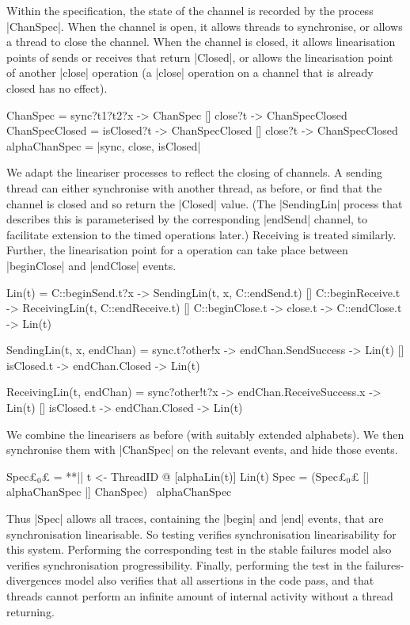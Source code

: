 Within the specification, the state of the channel is recorded by the process
|ChanSpec|.  When the channel is open, it allows threads to synchronise, or
allows a thread to close the channel.  When the channel is closed, it allows
linearisation points of sends or receives that return |Closed|, or allows the
linearisation point of another |close| operation (a |close| operation on a
channel that is already closed has no effect).
%
\begin{cspm}
ChanSpec = sync?t1?t2?x -> ChanSpec [] close?t -> ChanSpecClosed
ChanSpecClosed = isClosed?t -> ChanSpecClosed [] close?t -> ChanSpecClosed
alphaChanSpec = {|sync, close, isClosed|} 
\end{cspm}

We adapt the lineariser processes to reflect the closing of channels.  A
sending thread can either synchronise with another thread, as before, or find
that the channel is closed and so return the |Closed| value.  (The
|SendingLin| process that describes this is parameterised by the corresponding
|endSend| channel, to facilitate extension to the timed operations later.)
Receiving is treated similarly.  Further, the linearisation point for a
 operation can take place between |beginClose| and |endClose|
events.
%
\begin{cspm}
Lin(t) = 
  C::beginSend.t?x -> SendingLin(t, x, C::endSend.t)
  [] C::beginReceive.t -> ReceivingLin(t, C::endReceive.t)
  [] C::beginClose.t -> close.t -> C::endClose.t -> Lin(t)

SendingLin(t, x, endChan) = 
  sync.t?other!x -> endChan.SendSuccess -> Lin(t)
  [] isClosed.t -> endChan.Closed -> Lin(t)

ReceivingLin(t, endChan) =  
  sync?other!t?x -> endChan.ReceiveSuccess.x -> Lin(t)
  [] isClosed.t -> endChan.Closed -> Lin(t)
\end{cspm}

We combine the linearisers as before (with suitably extended alphabets).  We
then synchronise them with |ChanSpec| on the relevant events, and hide those
events.
%
\begin{cspm}
Spec£$_0$£ = **|| t <- ThreadID @ [alphaLin(t)] Lin(t)
Spec = (Spec£$_0$£ [| alphaChanSpec |] ChanSpec) \ alphaChanSpec
\end{cspm}
%
Thus |Spec| allows all traces, containing the |begin| and |end| events, that
are synchronisation linearisable.  So testing \CSPM{Spec [T= System}
verifies synchronisation linearisability for this system.  Performing the
corresponding test in the stable failures model also verifies synchronisation
progressibility.  Finally, performing the test in the failures-divergences
model also verifies that all assertions in the code pass, and that threads
cannot perform an infinite amount of internal activity without a thread
returning.

